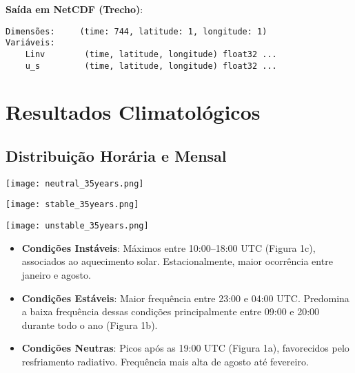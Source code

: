 \documentclass[12pt]{article}
\begin{document}
\textbf{Saída em NetCDF (Trecho)}:  
\begin{verbatim}  
Dimensões:     (time: 744, latitude: 1, longitude: 1)  
Variáveis:  
    Linv        (time, latitude, longitude) float32 ...  
    u_s         (time, latitude, longitude) float32 ...  
\end{verbatim}


\section{Resultados Climatológicos}
\subsection{Distribuição Horária e Mensal}
\begin{center}
    \begin{minipage}{0.49\textwidth}
        \centering
        \texttt{[image: neutral\_35years.png]}
    \end{minipage}
    \hfill
    \begin{minipage}{0.49\textwidth}
        \centering
        \texttt{[image: stable\_35years.png]}
    \end{minipage}

    \vspace{0.5cm}
    \texttt{[image: unstable\_35years.png]}
    
    \label{fig:clima}
\end{center}
\begin{itemize}
    \item \textbf{Condições Instáveis}: Máximos entre 10:00–18:00 UTC (Figura 1c), associados ao aquecimento solar. Estacionalmente, maior ocorrência entre janeiro e agosto.
    \item \textbf{Condições Estáveis}: Maior frequência entre 23:00 e 04:00 UTC. Predomina a baixa frequência dessas condições principalmente entre 09:00 e 20:00 durante todo o ano (Figura 1b).
    \item \textbf{Condições Neutras}: Picos após as 19:00 UTC (Figura 1a), favorecidos pelo resfriamento radiativo. Frequência mais alta de agosto até fevereiro.
\end{itemize}




\end{document}
